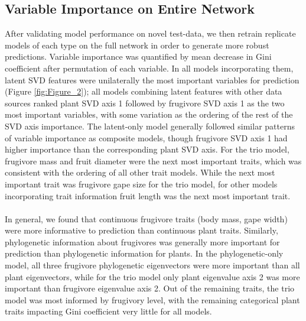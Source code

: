 \documentclass[num-refs]{article}%
\begin{document}
\subsection*{Variable Importance on Entire Network}
After validating model performance on novel test-data, we then retrain replicate models of each type on the full network in order to generate more robust predictions. Variable importance was quantified by mean decrease in Gini coefficient after permutation of each variable. In all models incorporating them, latent SVD features were unilaterally the most important variables for prediction (Figure \ref{fig:Figure_2}); all models combining latent features with other data sources ranked plant SVD axis 1 followed by frugivore SVD axis 1 as the two most important variables, with some variation as the ordering of the rest of the SVD axis importance. The latent-only model generally followed similar patterns of variable importance as composite models, though frugivore SVD axis 1 had higher importance than the corresponding plant SVD axis. For the trio model, frugivore mass and fruit diameter were the next most important traits, which was consistent with the ordering of all other trait models. While the next most important trait was frugivore gape size for the trio model, for other models incorporating trait information fruit length was the next most important trait. 

\paragraph*{}
In general, we found that continuous frugivore traits (body mass, gape width) were more informative to prediction than continuous plant traits. Similarly, phylogenetic information about frugivores was generally more important for prediction than phylogenetic information for plants. In the phylogenetic-only model, all three frugivore phylogenetic eigenvectors were more important than all plant eigenvectors, while for the trio model only plant eigenvalue axis 2 was more important than frugivore eigenvalue axis 2. Out of the remaining traits, the trio model was most informed by frugivory level, with the remaining categorical plant traits impacting Gini coefficient very little for all models. 
\end{document}
